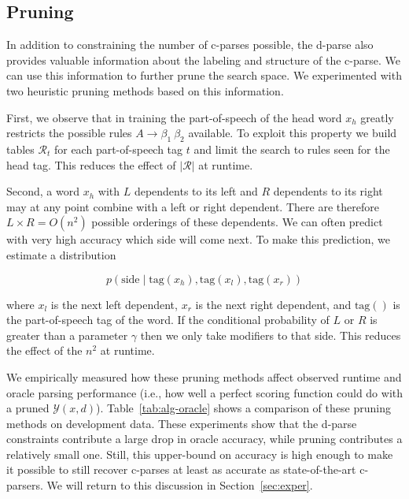 \documentclass[11pt,letterpaper]{article}
\newcommand{\rules}{\mathcal{R}}
\newcommand{\Rule}[3]{#1 \rightarrow #2\ #3}
\newcommand{\TagFN}[1]{\mathrm{tag}({#1})}
\begin{document}
\subsection{Pruning}
\label{sec:prune}

In addition to constraining the number of c-parses possible, 
the d-parse also provides valuable information about the labeling 
and structure of the c-parse. We can use this information to 
further prune the search space. We experimented with two 
heuristic pruning methods based on this information.

First, we observe that in training the part-of-speech of the head word $x_h$
greatly restricts the possible rules $\Rule{A}{\beta_1}{\beta_2}$ available.  To
exploit this property we build tables $\rules_t$ for each
part-of-speech tag $t$ and limit the search to rules seen for the
head tag. This reduces the effect of $|\rules|$ at runtime.

Second, a word $x_h$ with $L$ dependents to its left and $R$ dependents to 
its right may at any point  combine with a left or right dependent. There 
are therefore  $L\times R = O(n^2)$ possible orderings of these dependents.
We can often predict with very high accuracy which side will come next. 
To make this prediction, we estimate a distribution 

\[p(\textrm{side} \mid \TagFN{x_h}, \TagFN{x_l}, \TagFN{x_r})\]

where $x_l$ is the next left dependent, $x_r$ is the next right
dependent, and $\TagFN{}$ is the part-of-speech tag of the
word. If the conditional probability of $L$ or $R$ is greater
than a parameter $\gamma$ then we only take modifiers to that 
side. 
This reduces the effect of the $n^2$ at runtime. 
 

We empirically measured how these pruning methods affect observed
runtime and oracle parsing performance (i.e., how well a perfect
scoring function could do with a pruned $\mathcal{Y}(x, d)$).
Table~\ref{tab:alg-oracle} shows a comparison of these pruning
methods on development data.   These
experiments show that the d-parse constraints contribute a large drop
in oracle accuracy, while pruning contributes a relatively small one.
Still, this upper-bound on accuracy is high enough
to make it possible to still recover c-parses at least as accurate as
state-of-the-art c-parsers. We will return 
to this discussion in Section~\ref{sec:exper}.

\end{document}

